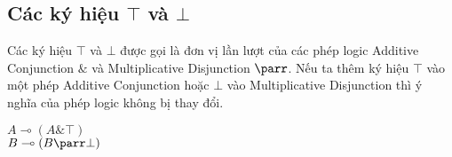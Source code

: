 \subsection{Các ký hiệu $\top$ và $\bot$}
Các ký hiệu $\top$ và $\bot$ được gọi là đơn vị lần lượt của các phép logic Additive Conjunction $\&$ và Multiplicative Disjunction $\parr$. Nếu ta thêm ký hiệu $\top$ vào một phép Additive Conjunction hoặc $\bot$ vào Multiplicative Disjunction thì ý nghĩa của phép logic không bị thay đổi.\\

\begin{center}
$A \multimap (A \& \top)$\\
$B \multimap (B \parr \bot)$
\end{center}